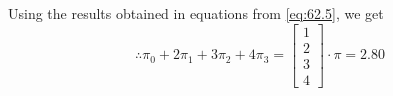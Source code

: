 \documentclass[journal,12pt,twocolumn]{IEEEtran}
\theoremstyle{remark}
\begin{document}
Using the results obtained in equations from \eqref{eq:62.5}, we get 
\begin{equation}
\therefore \pi_0 + 2\pi_1 + 3\pi_2 + 4\pi_3 = \begin{bmatrix}1\\
2\\
3\\
4
\end{bmatrix}
\cdot \pi = 2.80
\end{equation}
\end{document}
